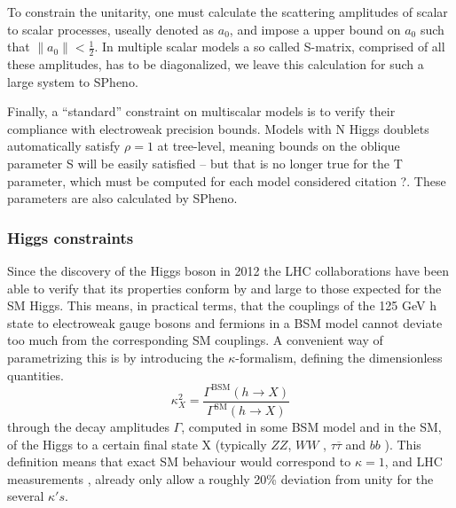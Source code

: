 To constrain the unitarity, one must calculate the scattering amplitudes of scalar to scalar processes, useally denoted as $a_0$, and impose a upper bound on $a_0$ such that $\|a_0\| < \frac{1}{2}$. In multiple scalar models a so called S-matrix, comprised of all these amplitudes, has to be diagonalized, we leave this calculation for such a large system to SPheno.

Finally, a “standard” constraint on multiscalar models is to verify their compliance with electroweak precision
bounds. 
%
Models with N Higgs doublets automatically satisfy $\rho = 1$ at tree-level, meaning bounds on the oblique parameter S will be easily satisfied – but that is no longer true for the T parameter, which must be computed for each model considered { \color{blue} citation ?}. These parameters are also calculated by SPheno. 

\subsubsection{Higgs constraints}

Since the discovery of the Higgs boson in 2012 the LHC collaborations have been able to verify that its properties
conform by and large to those expected for the SM Higgs. This means, in practical terms, that the couplings of
the 125 GeV h state to electroweak gauge bosons and fermions in a BSM model cannot deviate too much from
the corresponding SM couplings. A convenient way of parametrizing this is by introducing the $\kappa$-formalism,
defining the dimensionless quantities. 
\begin{equation}
\kappa^2_X = \frac{\Gamma^{\text{BSM}} (h \rightarrow X) }{\Gamma^{\text{SM}}(h \rightarrow X)}
\end{equation}
through the decay amplitudes $\Gamma$, computed in some BSM model and in the SM, of the Higgs to a certain final
state X (typically $ZZ$, $W W$ , $\tau \overline{\tau}$ and $bb$ ). This definition means that exact SM behaviour would correspond to $\kappa = 1$, and LHC measurements \cite{Aad_2016,Aad_2015}, already only allow a roughly 20\% deviation from unity for the several $\kappa's$.

